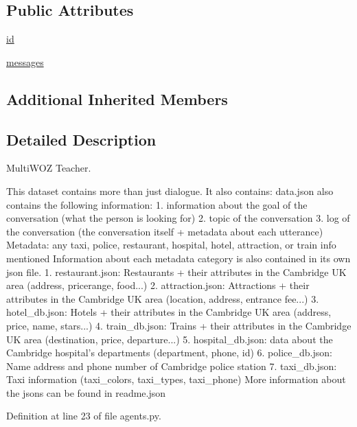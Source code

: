 \subsection*{Public Attributes}
\begin{DoxyCompactItemize}
\item 
\hyperlink{classparlai_1_1tasks_1_1multiwoz_1_1agents_1_1MultiWozTeacher_a8e59cea446db2909435c9bac275e2539}{id}
\item 
\hyperlink{classparlai_1_1tasks_1_1multiwoz_1_1agents_1_1MultiWozTeacher_a40d3917ab5dadef1f822ac3c1d06c915}{messages}
\end{DoxyCompactItemize}
\subsection*{Additional Inherited Members}


\subsection{Detailed Description}
\begin{DoxyVerb}MultiWOZ Teacher.

This dataset contains more than just dialogue. It also contains:
data.json also contains the following information:
1. information about the goal of the conversation (what the person is looking for)
2. topic of the conversation
3. log of the conversation (the conversation itself + metadata about each utterance)
      Metadata: any taxi, police, restaurant, hospital, hotel, attraction, or train info mentioned
Information about each metadata category is also contained in its own json file.
1. restaurant.json: Restaurants + their attributes in the Cambridge UK area (address, pricerange, food...)
2. attraction.json: Attractions + their attributes in the Cambridge UK area (location, address, entrance fee...)
3. hotel_db.json: Hotels + their attributes in the Cambridge UK area  (address, price, name, stars...)
4. train_db.json: Trains + their attributes in the Cambridge UK area (destination, price, departure...)
5. hospital_db.json: data about the Cambridge hospital's departments (department, phone, id)
6. police_db.json: Name address and phone number of Cambridge police station
7. taxi_db.json: Taxi information (taxi_colors, taxi_types, taxi_phone)
More information about the jsons can be found in readme.json
\end{DoxyVerb}
 

Definition at line 23 of file agents.\+py.



